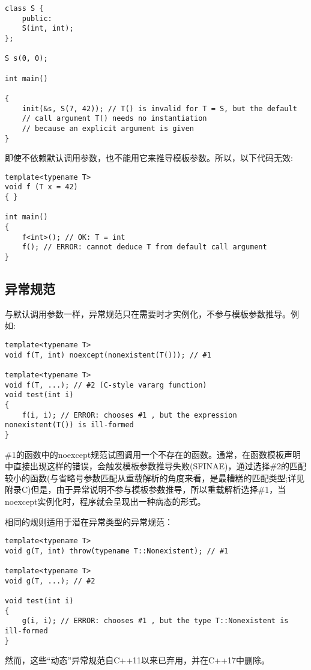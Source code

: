 \begin{lstlisting}[style=styleCXX]
class S {
	public:
	S(int, int);
};

S s(0, 0);

int main()

{
	init(&s, S(7, 42)); // T() is invalid for T = S, but the default
	// call argument T() needs no instantiation
	// because an explicit argument is given
}
\end{lstlisting}

即使不依赖默认调用参数，也不能用它来推导模板参数。所以，以下代码无效:

\begin{lstlisting}[style=styleCXX]
template<typename T>
void f (T x = 42)
{ }

int main()
{
	f<int>(); // OK: T = int
	f(); // ERROR: cannot deduce T from default call argument
}
\end{lstlisting}

\subsection{异常规范}

与默认调用参数一样，异常规范只在需要时才实例化，不参与模板参数推导。例如:

\begin{lstlisting}[style=styleCXX]
template<typename T>
void f(T, int) noexcept(nonexistent(T())); // #1

template<typename T>
void f(T, ...); // #2 (C-style vararg function)
void test(int i)
{
	f(i, i); // ERROR: chooses #1 , but the expression nonexistent(T()) is ill-formed
}
\end{lstlisting}

\#1的函数中的noexcept规范试图调用一个不存在的函数。通常，在函数模板声明中直接出现这样的错误，会触发模板参数推导失败(SFINAE)，通过选择\#2的匹配较小的函数(与省略号参数匹配从重载解析的角度来看，是最糟糕的匹配类型;详见附录C)但是，由于异常说明不参与模板参数推导，所以重载解析选择\#1，当noexcept实例化时，程序就会呈现出一种病态的形式。

相同的规则适用于潜在异常类型的异常规范：

\begin{lstlisting}[style=styleCXX]
template<typename T>
void g(T, int) throw(typename T::Nonexistent); // #1

template<typename T>
void g(T, ...); // #2

void test(int i)
{
	g(i, i); // ERROR: chooses #1 , but the type T::Nonexistent is ill-formed
}
\end{lstlisting}

然而，这些“动态”异常规范自C++11以来已弃用，并在C++17中删除。


















